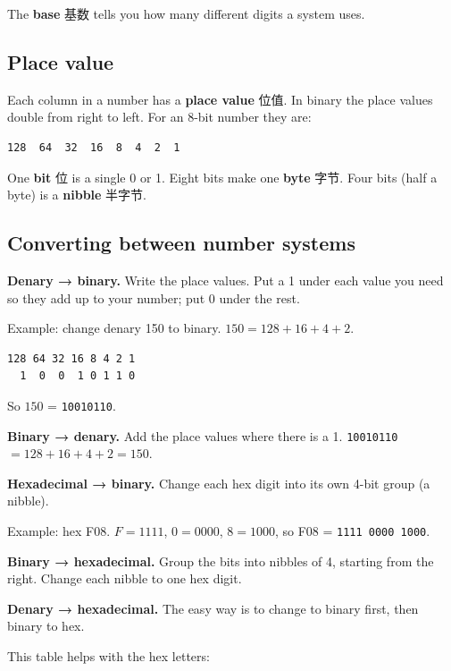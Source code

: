 \documentclass[11pt]{article}
\begin{document}
The \textbf{base} 基数 tells you how many different digits a system uses.

\subsection*{Place value}

Each column in a number has a \textbf{place value} 位值. In binary the place values double from right to left. For an 8-bit number they are:

\begin{Verbatim}
128  64  32  16  8  4  2  1
\end{Verbatim}

One \textbf{bit} 位 is a single 0 or 1. Eight bits make one \textbf{byte} 字节. Four bits (half a byte) is a \textbf{nibble} 半字节.

\subsection*{Converting between number systems}

\textbf{Denary → binary.} Write the place values. Put a 1 under each value you need so they add up to your number; put 0 under the rest.

Example: change denary 150 to binary. $150 = 128 + 16 + 4 + 2$.

\begin{Verbatim}
128 64 32 16 8 4 2 1
  1  0  0  1 0 1 1 0
\end{Verbatim}

So $150$ = \texttt{10010110}.

\textbf{Binary → denary.} Add the place values where there is a 1. \texttt{10010110} $= 128 + 16 + 4 + 2 = 150$.

\textbf{Hexadecimal → binary.} Change each hex digit into its own 4-bit group (a nibble).

Example: hex F08. $F = 1111$, $0 = 0000$, $8 = 1000$, so F08 = \texttt{1111 0000 1000}.

\textbf{Binary → hexadecimal.} Group the bits into nibbles of 4, starting from the right. Change each nibble to one hex digit.

\textbf{Denary → hexadecimal.} The easy way is to change to binary first, then binary to hex.

This table helps with the hex letters:

\begin{center}
\end{center}
\end{document}
